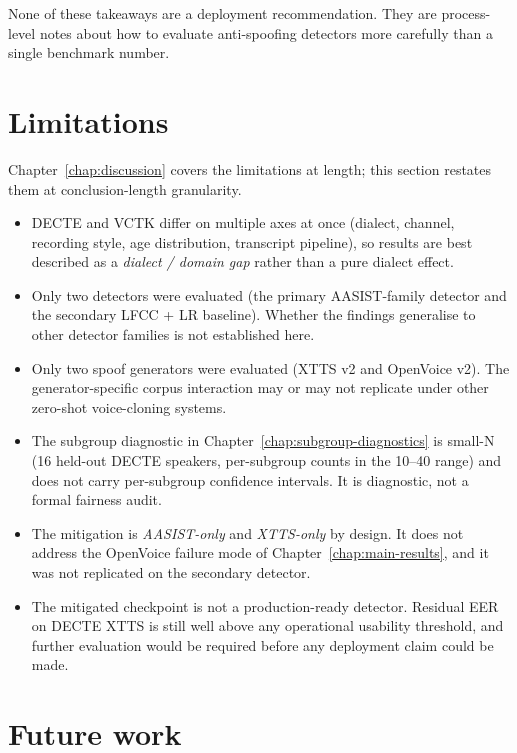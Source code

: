 None of these takeaways are a deployment recommendation.
They are process-level notes about how to evaluate anti-spoofing
detectors more carefully than a single benchmark number.


\section{Limitations}
\label{sec:conclusion-limitations}

Chapter~\ref{chap:discussion} covers the limitations at length; this section restates
them at conclusion-length granularity.

\begin{itemize}
    \item DECTE and VCTK differ on multiple axes at once (dialect,
        channel, recording style, age distribution, transcript
        pipeline), so results are best described as a \emph{dialect /
        domain gap} rather than a pure dialect effect.
    \item Only two detectors were evaluated (the primary AASIST-family
        detector and the secondary LFCC + LR baseline). Whether the
        findings generalise to other detector families is not
        established here.
    \item Only two spoof generators were evaluated (XTTS v2 and
        OpenVoice v2). The generator-specific corpus interaction may
        or may not replicate under other zero-shot voice-cloning
        systems.
    \item The subgroup diagnostic in Chapter~\ref{chap:subgroup-diagnostics} is small-N (16 held-out
        DECTE speakers, per-subgroup counts in the 10--40 range) and
        does not carry per-subgroup confidence intervals. It is
        diagnostic, not a formal fairness audit.
    \item The mitigation is \emph{AASIST-only} and \emph{XTTS-only} by design. It
        does not address the OpenVoice failure mode of Chapter~\ref{chap:main-results}, and
        it was not replicated on the secondary detector.
    \item The mitigated checkpoint is not a production-ready detector.
        Residual EER on DECTE XTTS is still well above any operational
        usability threshold, and further evaluation would be required
        before any deployment claim could be made.
\end{itemize}


\section{Future work}
\label{sec:conclusion-future-work}

